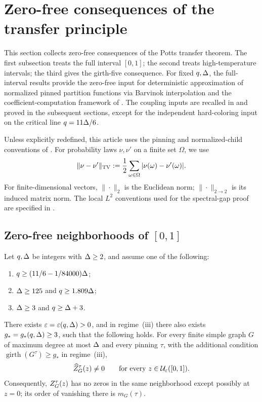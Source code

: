 \section{Zero-free consequences of the transfer principle}
\label{app:additional-potts}\label{sec:additional-potts-results}

This section collects zero-free consequences of the Potts transfer theorem.
The first subsection treats the full interval \([0,1]\); the second treats
high-temperature intervals; the third gives the girth-five consequence.
For fixed \(q,\Delta\), the full-interval results provide the zero-free input
for deterministic approximation of normalized pinned partition functions
via Barvinok interpolation and the coefficient-computation framework
of \cite{Barvinok2016,PatelRegts2017}.
The coupling inputs are recalled in  and proved in the subsequent
sections, except for the independent hard-coloring input on the critical line
\(q=11\Delta/6\).

Unless explicitly redefined, this article uses the pinning and normalized-child
conventions of .  For probability laws \(\nu,\nu'\) on a
finite set \(\Omega\), we use
\[
 \|\nu-\nu'\|_{\rm TV}:=\frac12\sum_{\omega\in\Omega}
       |\nu(\omega)-\nu'(\omega)|.
\]
For finite-dimensional vectors, \(\|\cdot\|_2\) is the Euclidean norm;
\(\|\cdot\|_{2\to2}\) is its induced matrix norm.  The local
\(L^2\) conventions used for the spectral-gap proof are specified in
.

\subsection{Zero-free neighborhoods of \texorpdfstring{\([0,1]\)}{[0,1]}}

\begin{theorem}
\label{thm:additional-potts-zf}
Let \(q,\Delta\) be integers with \(\Delta\ge2\), and assume one of the
following:
\begin{enumerate}[label=\textup{(\roman*)},leftmargin=2.2em]
  \item\label{case:intro-near-vigoda}
        \(q\ge(11/6-1/84000)\Delta\);
  \item\label{case:intro-1809}
        \(\Delta\ge125\) and \(q\ge1.809\Delta\);
  \item\label{case:intro-large-girth}
        \(\Delta\ge3\) and \(q\ge\Delta+3\).
\end{enumerate}
There exists \(\varepsilon=\varepsilon(q,\Delta)>0\), and in
regime~\textup{(iii)} there also exists
\(g_*=g_*(q,\Delta)\ge3\), such that the following holds.  For every finite
simple graph \(G\) of maximum degree at most \(\Delta\) and every pinning
\(\tau\), with the additional condition
\(\operatorname{girth}(G^\tau)\ge g_*\) in regime~\textup{(iii)},
\[
  \widehat Z_{G}^{\tau}(z)\ne0
  \qquad\text{for every }z\in\mathcal U_\varepsilon([0,1]).
\]
Consequently, \(Z_{G}^{\tau}(z)\) has no zeros in the same neighborhood
except possibly at \(z=0\); its order of vanishing there is
\(m_G(\tau)\).
\end{theorem}

